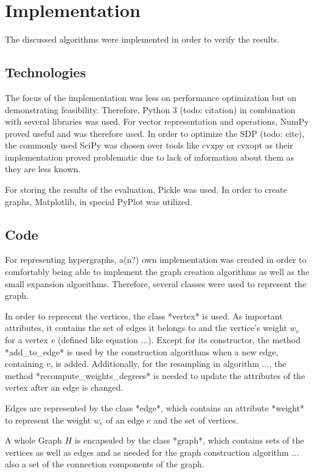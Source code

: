 \chapter{Implementation}\label{chapter:implementation}

The discussed algorithms were implemented in order to verify the results.
\section{Technologies}
The focus of the implementation was less on performance optimization but on demonstrating feasibility. Therefore, Python 3 (todo: citation) in combination with several libraries was used.
For vector representation and operations, NumPy proved useful and was therefore used. In order to optimize the SDP (todo: cite), the commonly used SciPy was chosen over tools like cvxpy or cvxopt as their implementation proved problematic due to lack of information about them as they are less known.

For storing the results of the evaluation, Pickle was used. In order to create graphs, Matplotlib, in special PyPlot was utilized.



\section{Code}
For representing hypergraphs, a(n?) own implementation was created in order to comfortably being able to implement the graph creation algorithms as well as the small expansion algoeithms.
Therefore, several classes were used to represent the graph.

In order to reprecent the vertices, the class *vertex* is used. As important attributes, it contains the set of edges it belongs to and the vertice's weight $w_v$ for a vertex $v$ (defined like equation ...). Except for its constructor, the method *add\_to\_edge* is used by the construction algorithms when a new edge, containing $v$, is added. Additionally, for the resampling in algorithm ..., the method *recompute\_weights\_degrees* is needed to update the attributes of the vertex after an edge is changed.

Edges are represented by the class *edge*, which contains an attribute *weight* to represent the weight $w_e$ of an edge $e$ and the set of vertices.

A whole Graph $H$ is encapsuled by the class *graph*, which contains sets of the vertices as well as edges and as needed for the graph construction algorithm ... also a set of the connection components of the graph.

